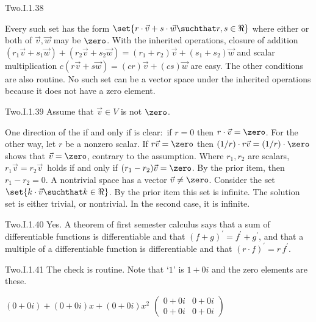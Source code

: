 \begin{ans}{Two.I.1.38}
     \begin{exparts}
      \partsitem Every such set has the form
        \( \set{r\cdot\vec{v}+s\cdot\vec{w}\suchthat r,s\in\Re} \)
        where either or both of \( \vec{v},\vec{w} \) may be \( \zero \).
        With the inherited operations, closure of addition
        \( (r_1\vec{v}+s_1\vec{w})+(r_2\vec{v}+s_2\vec{w})
           =(r_1+r_2)\vec{v}+(s_1+s_2)\vec{w} \)
        and scalar multiplication
        \( c(r\vec{v}+s\vec{w})=(cr)\vec{v}+(cs)\vec{w} \)
        are easy.
        The other conditions are also routine.
      \partsitem No such set can be a vector space under the inherited
        operations because it does not have a zero element.
     \end{exparts}
    
\end{ans}
\begin{ans}{Two.I.1.39}
      Assume that \( \vec{v}\in V \) is not \( \zero \).
      \begin{exparts}
        \partsitem One direction of the if and only if is clear:~if $r=0$
          then $r\cdot\vec{v}=\zero$.
          For the other way, let \( r \) be a nonzero scalar.
          If \( r\vec{v}=\zero \) then
          \( (1/r)\cdot r\vec{v}=(1/r)\cdot \zero \) shows that
          $\vec{v}=\zero$,  contrary to the assumption.
        \partsitem Where \( r_1,r_2 \) are scalars,
          \( r_1\vec{v}=r_2\vec{v}\, \)
          holds if and only if \( (r_1-r_2)\vec{v}=\zero \).
          By the prior item, then \( r_1-r_2=0 \).
        \partsitem A nontrivial space has a vector
          \( \vec{v}\neq\zero \).
          Consider the set \( \set{k\cdot\vec{v}\suchthat k\in\Re} \).
          By the prior item this set is infinite.
        \partsitem The solution set is either trivial, or nontrivial.
          In the second case, it is infinite.
     \end{exparts}
    
\end{ans}
\begin{ans}{Two.I.1.40}
      Yes.
      A theorem of first semester calculus says that a sum of differentiable
      functions is differentiable and that
      \( (f+g)^\prime=f^\prime+g^\prime \), and that
      a multiple of a differentiable
      function is differentiable and that \( (r\cdot f)^\prime=r\,f^\prime \).
    
\end{ans}
\begin{ans}{Two.I.1.41}
      The check is routine.
      Note that `\( 1 \)' is \( 1+0i \) and the zero elements are these.
      \begin{exparts}
        \partsitem \( (0+0i)+(0+0i)x+(0+0i)x^2 \)
        \partsitem \( \begin{pmatrix}
                   0+0i  &0+0i  \\
                   0+0i  &0+0i
                 \end{pmatrix} \)
      \end{exparts}
    
\end{ans}
